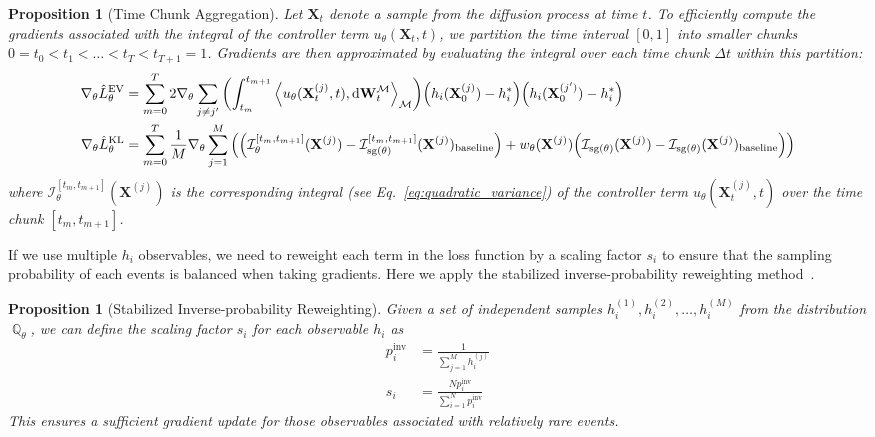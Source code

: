 \documentclass{article}
\theoremstyle{plain}
\newtheorem{proposition}[theorem]{Proposition}
\theoremstyle{definition}
\theoremstyle{remark}
\DeclareMathOperator{\Q}{\mathbb{Q}}
\DeclareMathOperator{\sg}{\mathrm{sg}}
\newcommand{\inner}[2]{\left\langle #1, #2\right\rangle}
\begin{document}
\begin{proposition}[Time Chunk Aggregation]\label{prop:time_chunk_aggregation}
    Let $\mathbf{X}_t$ denote a sample from the diffusion process at time $t$. To efficiently compute the gradients associated with the integral of the controller term $u_\theta(\mathbf{X}_t, t)$, we partition the time interval $[0, 1]$ into smaller chunks $0 = t_0 < t_1 < \dots < t_T < t_{T+1} = 1$. Gradients are then approximated by evaluating the integral over each time chunk $\Delta t$ within this partition:
    \begin{equation}
        \begin{aligned}
            \nabla_\theta \hat{L}_\theta^\text{EV} &= \sum_{m=0}^T 2\nabla_\theta \sum_{j\neq j'}\qty(\int_{t_m}^{t_{m+1}} \inner{u_\theta(\mathbf{X}_t^{(j)}, t)}{\dd \mathbf{W}_t^\mathcal{M}}_\mathcal{M})\qty(h_i(\mathbf{X}_0^{(j)})-h_i^*)\qty(h_i(\mathbf{X}_0^{(j')})-h_i^*) \\
            \nabla_\theta \hat{L}_\theta^\text{KL} &= \sum_{m=0}^T\frac{1}{M}\nabla_\theta\sum_{j=1}^M \qty(\qty(\mathcal{I}_\theta^{[t_m, t_{m+1}]}(\mathbf{X}^{(j)}) - \mathcal{I}_{\sg(\theta)}^{[t_m, t_{m+1}]}(\mathbf{X}^{(j)})_\text{baseline}) + w_\theta(\mathbf{X}^{(j)})\qty(\mathcal{I}_{\sg(\theta)}(\mathbf{X}^{(j)}) - \mathcal{I}_{\sg(\theta)}(\mathbf{X}^{(j)})_\text{baseline})) \\
        \end{aligned}
    \end{equation}
    where $\mathcal{I}_\theta^{[t_m, t_{m+1}]}(\mathbf{X}^{(j)})$ is the corresponding integral (see Eq.~\eqref{eq:quadratic_variance}) of the controller term $u_\theta(\mathbf{X}_t^{(j)}, t)$ over the time chunk $[t_m, t_{m+1}]$.
\end{proposition}

If we use multiple $h_i$ observables, we need to reweight each term in the loss function by a scaling factor $s_i$ to ensure that the sampling probability of each events is balanced when taking gradients. Here we apply the stabilized inverse-probability reweighting method~\cite{inverse_probability}.

\begin{proposition}[Stabilized Inverse-probability Reweighting]\label{prop:inverse_probabilities}
    Given a set of independent samples $h_i^{(1)}, h_i^{(2)}, \dots, h_i^{(M)}$ from the distribution $\Q_\theta$, we can define the scaling factor $s_i$ for each observable $h_i$ as
    \begin{equation}
        \begin{aligned}
            p_i^\mathrm{inv} &= \frac{1}{\sum_{j=1}^{M} h_i^{(j)}} \\
            s_i &= \frac{N p_i^\mathrm{inv}}{\sum_{i=1}^{N} p_i^\mathrm{inv}}
        \end{aligned}
    \end{equation}
    This ensures a sufficient gradient update for those observables associated with relatively rare events.
\end{proposition}
\end{document}
